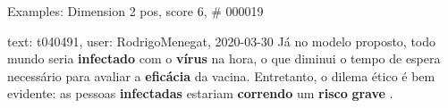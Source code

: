 \begin{frame}{Examples: Dimension 2 pos, score 6, \# 000019}
\footnotesize
\begin{exampleblock}{text: t040491, user: RodrigoMenegat, 2020-03-30}
Já no modelo proposto, todo mundo seria \textbf{infectado} com o \textbf{vírus} 
na hora, o que diminui o tempo de espera necessário para avaliar a 
\textbf{eficácia} da vacina. Entretanto, o dilema ético é bem evidente: as 
pessoas \textbf{infectadas} estariam \textbf{correndo} um \textbf{risco} 
\textbf{grave} . 
\end{exampleblock}
\end{frame}
